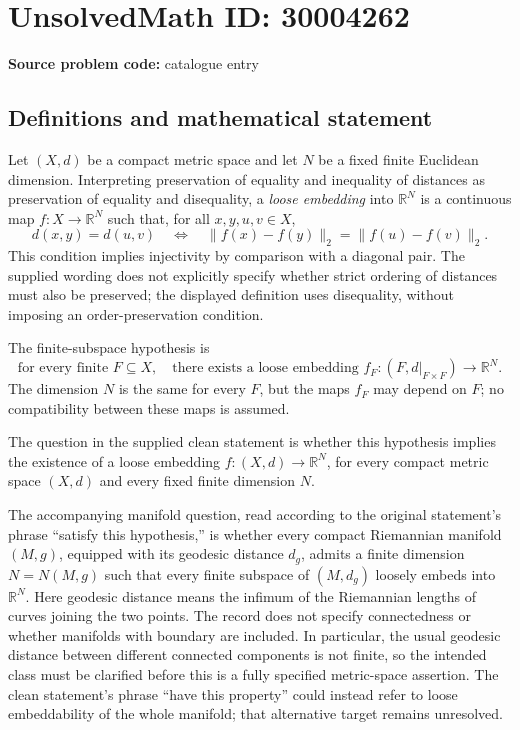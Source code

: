 \documentclass[11pt]{article}
\newcommand{\R}{\mathbb{R}}
\begin{document}
\section*{UnsolvedMath ID: 30004262}
\textbf{Source problem code:} catalogue entry
\subsection{Definitions and mathematical statement}
Let \((X,d)\) be a compact metric space and let \(N\) be a fixed finite Euclidean dimension. Interpreting preservation of equality and inequality of distances as preservation of equality and disequality, a \emph{loose embedding} into \(\R^N\) is a continuous map \(f:X\to\R^N\) such that, for all \(x,y,u,v\in X\),
\[
 d(x,y)=d(u,v)
 \quad\Longleftrightarrow\quad
 \|f(x)-f(y)\|_2=\|f(u)-f(v)\|_2.
\]
This condition implies injectivity by comparison with a diagonal pair. The supplied wording does not explicitly specify whether strict ordering of distances must also be preserved; the displayed definition uses disequality, without imposing an order-preservation condition.

The finite-subspace hypothesis is
\[
 \text{for every finite }F\subseteq X,\quad
 \text{there exists a loose embedding }
 f_F:(F,d|_{F\times F})\longrightarrow\R^N.
\]
The dimension \(N\) is the same for every \(F\), but the maps \(f_F\) may depend on \(F\); no compatibility between these maps is assumed.

The question in the supplied clean statement is whether this hypothesis implies the existence of a loose embedding \(f:(X,d)\to\R^N\), for every compact metric space \((X,d)\) and every fixed finite dimension \(N\).

The accompanying manifold question, read according to the original statement's phrase ``satisfy this hypothesis,'' is whether every compact Riemannian manifold \((M,g)\), equipped with its geodesic distance \(d_g\), admits a finite dimension \(N=N(M,g)\) such that every finite subspace of \((M,d_g)\) loosely embeds into \(\R^N\). Here geodesic distance means the infimum of the Riemannian lengths of curves joining the two points. The record does not specify connectedness or whether manifolds with boundary are included. In particular, the usual geodesic distance between different connected components is not finite, so the intended class must be clarified before this is a fully specified metric-space assertion. The clean statement's phrase ``have this property'' could instead refer to loose embeddability of the whole manifold; that alternative target remains unresolved.
\end{document}
